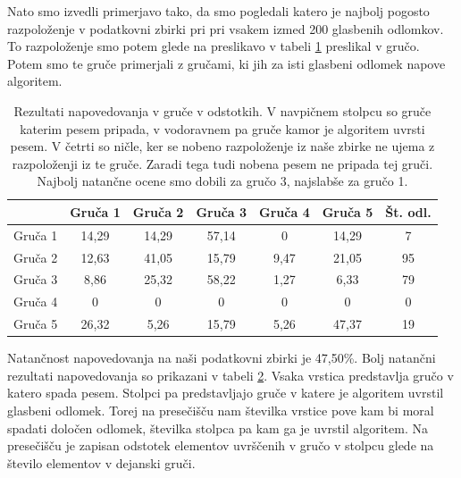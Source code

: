 \documentclass[a4paper, 12pt]{book}
\begin{document}
{\begin{table}[htb]
\begin{center}
\begin{tabular}{|l|c|}
\hline
\end{tabular}
\label{gruce_nase}
\end{center}
\end{table}

Nato smo izvedli primerjavo tako, da smo pogledali katero je najbolj pogosto razpoloženje v podatkovni zbirki pri pri vsakem izmed 200 glasbenih odlomkov. To razpoloženje smo potem glede na preslikavo v tabeli \ref{gruce_nase} preslikal v gručo. Potem smo te gruče primerjali z gručami, ki jih za isti glasbeni odlomek napove algoritem. 

\begin{table}[htb]
\begin{center}
\caption{Rezultati napovedovanja v gruče v odstotkih. V navpičnem stolpcu so gruče katerim pesem pripada, v vodoravnem pa gruče kamor je algoritem uvrsti pesem. V četrti so ničle, ker se nobeno razpoloženje iz naše zbirke ne ujema z razpoloženji iz te gruče. Zaradi tega tudi nobena pesem ne pripada tej gruči. Najbolj natančne ocene smo dobili za gručo 3, najslabše za gručo 1.}
\begin{tabular}{|l|c|c|c|c|c|c|}
\hline
 & Gruča 1 & Gruča 2 & Gruča 3 & Gruča 4 & Gruča 5 & Št. odl.\\ \hline
Gruča 1 & 14,29 & 14,29	& 57,14 & 0 & 14,29 & 7\\ \hline
Gruča 2 & 12,63 & 41,05 & 15,79 & 9,47 & 21,05 & 95\\ \hline
Gruča 3 & 8,86 & 25,32 & 58,22 & 1,27 & 6,33 & 79\\ \hline
Gruča 4 & 0	& 0 & 0 & 0 & 0 & 0\\ \hline
Gruča 5 & 26,32	& 5,26	& 15,79 & 5,26 & 47,37 & 19 \\ \hline

\hline
\end{tabular}
\label{natancnost_gruce_nasa}
\end{center}
\end{table}

Natančnost napovedovanja na naši podatkovni zbirki je 47,50\%. Bolj natančni rezultati napovedovanja so prikazani v tabeli \ref{natancnost_gruce_nasa}. Vsaka vrstica predstavlja gručo v katero spada pesem. Stolpci pa predstavljajo gruče v katere je algoritem uvrstil glasbeni odlomek. Torej na presečišču nam številka vrstice pove kam bi moral spadati določen odlomek, številka stolpca pa kam ga je uvrstil algoritem. Na presečišču je zapisan odstotek elementov uvrščenih v gručo v stolpcu glede na število elementov v dejanski gruči. 

}
\end{document}
